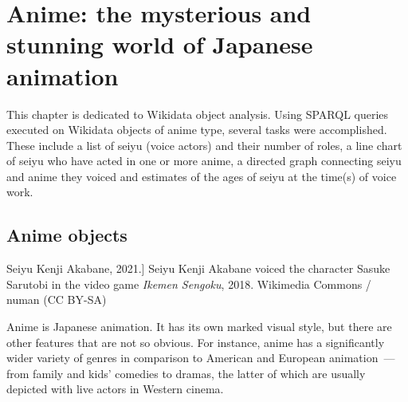 
\chapter{Anime: the mysterious and stunning world of Japanese animation\protect\footnotemark}




This chapter is dedicated to  Wikidata object analysis. Using SPARQL queries executed on Wikidata objects of anime type, several tasks were accomplished. These include a list of seiyu (voice actors) and their number of roles, a line chart of seiyu who have acted in one or more anime, a directed graph connecting seiyu and anime they voiced and estimates of the ages of seiyu at the time(s) of voice work.

\section{Anime objects}

\begin{marginfigure}[0.0cm]
{
	\setlength{\fboxsep}{0pt}%
	\setlength{\fboxrule}{1pt}%
}
\caption
[Seiyu Kenji Akabane, 2021.]
{
Seiyu Kenji Akabane voiced the character Sasuke Sarutobi in the video game \emph{Ikemen Sengoku}, 2018.\newline
Wikimedia Commons / numan (CC BY-SA)
}
\label{fig:seiyu}
\end{marginfigure}

Anime is Japanese animation. It has its own marked visual style, but there are other features that are not so obvious. For instance, anime has a significantly wider variety of genres in comparison to American and European animation~--- from family and kids' comedies to dramas, the latter of which are usually depicted with live actors in Western cinema.

